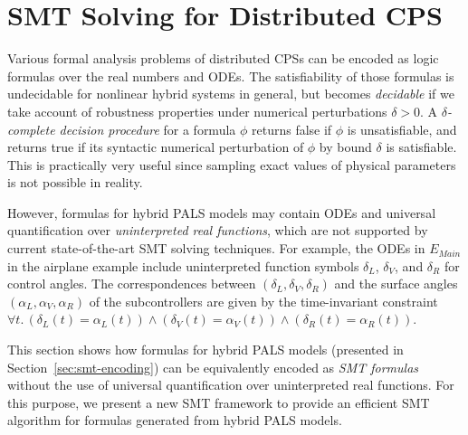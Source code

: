 

\section{SMT Solving for Distributed CPS}
\label{sec:smt-logic}

Various formal analysis problems of distributed CPSs 
can be encoded as logic formulas over the real numbers and ODEs.
%
The satisfiability of those formulas is undecidable for nonlinear hybrid systems  in general,
but becomes \emph{decidable} %
if we take account of robustness properties %
under numerical perturbations $\delta > 0$.
%
A \emph{$\delta$-complete decision procedure} for a formula $\phi$ returns false 
if $\phi$ is unsatisfiable, and returns true if its syntactic 
numerical perturbation of $\phi$ by bound $\delta$ is satisfiable. 
This is practically very useful since 
sampling exact values of physical parameters is not possible in reality. 

However, formulas for hybrid PALS models
may contain ODEs and universal quantification over \emph{uninterpreted real functions},
which are not supported by current state-of-the-art SMT solving techniques.
%
For example, the ODEs in $E_\mathit{Main}$ %
in the airplane example
include uninterpreted function symbols $\delta_L$, $\delta_V$, and $\delta_R$ for control angles.
The correspondences between  %
$(\delta_L, \delta_V, \delta_R)$ 
and the surface angles $(\alpha_L,\alpha_V,\alpha_R)$ of the subcontrollers
are given by the time-invariant constraint
$\forall t.\, (\delta_L(t) = \alpha_L(t)) \wedge (\delta_V(t) = \alpha_V(t)) \wedge (\delta_R(t) = \alpha_R(t))$.


This section shows how formulas for hybrid PALS models (presented in Section~\ref{sec:smt-encoding})
can be equivalently encoded as \emph{SMT formulas}
without the use of universal quantification over uninterpreted real functions.
For this purpose, we present a new  SMT framework to provide 
an efficient SMT algorithm
for  formulas generated from hybrid PALS models.

